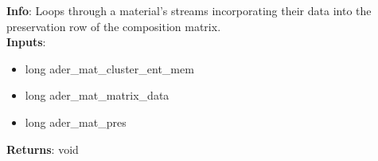 \textbf{Info}: Loops through a material's streams incorporating their data into
the preservation row of the composition matrix.\\

\noindent \textbf{Inputs}:
\begin{itemize}
\item{long ader\_mat\_cluster\_ent\_mem}
\item{long ader\_mat\_matrix\_data}
\item{long ader\_mat\_pres}
\end{itemize}

\noindent \textbf{Returns}: void
